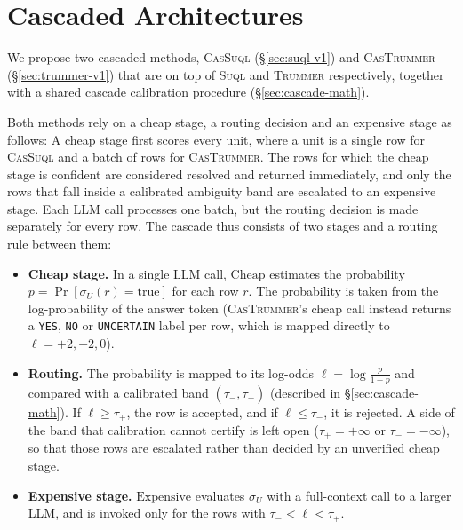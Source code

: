\documentclass[sigconf]{acmart}
\begin{document}
\section{Cascaded Architectures}
\label{sec:contributions}
We propose two cascaded methods, \textsc{CasSuql} (\S\ref{sec:suql-v1}) and \textsc{CasTrummer} (\S\ref{sec:trummer-v1}) that are on top of \textsc{Suql} and \textsc{Trummer} respectively, together with a shared cascade calibration procedure (\S\ref{sec:cascade-math}).

Both methods rely on a cheap stage, a routing decision and an expensive stage as follows: %
A cheap stage first scores every unit, where a unit is a single row for \textsc{CasSuql} and a batch of rows for \textsc{CasTrummer}. The rows for which the cheap stage is confident are considered resolved and returned immediately, and only the rows that fall inside a calibrated ambiguity band are escalated to an expensive stage. Each LLM call processes one batch, but the routing decision is made separately for every row. The cascade thus consists of two stages and a routing rule between them:
\begin{itemize}
  \item \textbf{Cheap stage.} In a single LLM call, $\mathrm{Cheap}$ estimates the probability $p = \Pr[\sigma_U(r) = \text{true}]$ for each row $r$. The probability is taken from the log-probability of the answer token (\textsc{CasTrummer}'s cheap call instead returns a \texttt{YES}, \texttt{NO} or \texttt{UNCERTAIN} label per row, which is mapped directly to $\ell = +2, -2, 0$).
  \item \textbf{Routing.} The probability is mapped to its log-odds $\ell = \log \frac{p}{1-p}$ and compared with a calibrated band $(\tau_-, \tau_+)$ (described in \S\ref{sec:cascade-math}). If $\ell \ge \tau_+$, the row is accepted, and if $\ell \le \tau_-$, it is rejected. A side of the band that calibration cannot certify is left open ($\tau_+{=}{+}\infty$ or $\tau_-{=}{-}\infty$), so that those rows are escalated rather than decided by an unverified cheap stage.
  \item \textbf{Expensive stage.} $\mathrm{Expensive}$ evaluates $\sigma_U$ with a full-context call to a larger LLM, and is invoked only for the rows with $\tau_- < \ell < \tau_+$.
\end{itemize}
\end{document}
